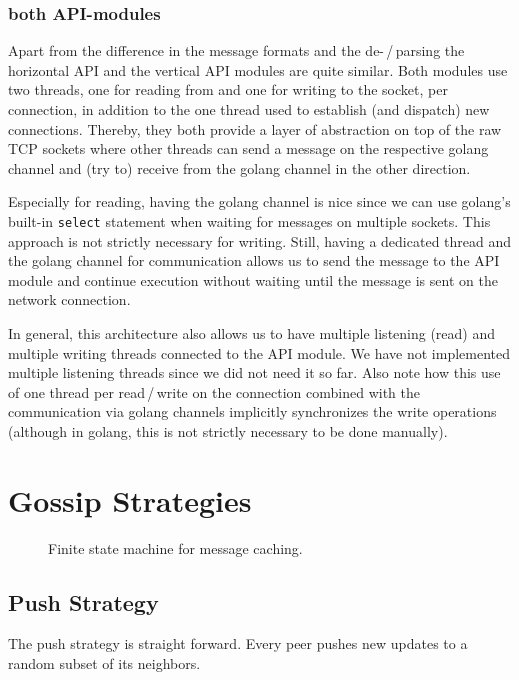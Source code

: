 \documentclass[a4paper,english,10pt,NET]{tumarticle}
\begin{document}
\subsubsection{both API-modules}
Apart from the difference in the message formats and the de-\,/\,parsing the horizontal API and the vertical API modules are quite similar.
Both modules use two threads, one for reading from and one for writing to the socket, per connection, in addition to the one thread used to establish (and dispatch) new connections.
Thereby, they both provide a layer of abstraction on top of the raw TCP sockets where other threads can send a message on the respective golang channel and (try to) receive from the golang channel in the other direction.

Especially for reading, having the golang channel is nice since we can use golang's built-in \texttt{select} statement when waiting for messages on multiple sockets.
This approach is not strictly necessary for writing.
Still, having a dedicated thread and the golang channel for communication allows us to send the message to the API module and continue execution without waiting until the message is sent on the network connection.

In general, this architecture also allows us to have multiple listening (read) and multiple writing threads connected to the API module.
We have not implemented multiple listening threads since we did not need it so far.
Also note how this use of one thread per read\,/\,write on the connection combined with the communication via golang channels implicitly synchronizes the write operations (although in golang, this is not strictly necessary to be done manually).


\section{Gossip Strategies}

\begin{figure}
	\centering
	
	\caption{Finite state machine for message caching.}
	\label{fig:fsm_msgs}
\end{figure}

\subsection{Push Strategy}
The push strategy is straight forward.
Every peer pushes new updates to a random subset of its neighbors.
\end{document}
